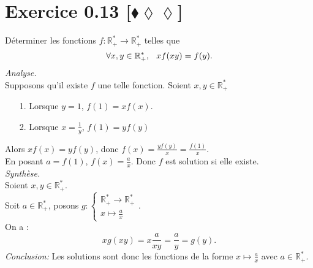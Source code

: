 \documentclass[10pt]{article}
\begin{document}
\section*{Exercice 0.13 [$\blacklozenge\lozenge\lozenge$]}
\begin{tcolorbox}[enhanced, width=7in, center, size=fbox, fontupper=\large, drop shadow southwest]
    Déterminer les fonctions $f: \mathbb{R}_+^* \rightarrow \mathbb{R}_+^*$ telles que 
    \begin{equation*}
        \forall{x,y\in\mathbb{R}^*_+}, \hspace{0.25cm} xf(xy) = f(y).
    \end{equation*}
    \emph{Analyse.}\\
    Supposons qu'il existe $f$ une telle fonction. Soient $x,y\in\mathbb{R}^*_+$
    \begin{itemize}
        \item[1.] Lorsque $y=1$, $f(1)=xf(x)$.
        \item[2.] Lorsque $x=\frac{1}{y}$, $f(1)=yf(y)$
    \end{itemize}
    Alors $xf(x)=yf(y)$, donc $f(x)=\frac{yf(y)}{x}=\frac{f(1)}{x}$.\\
    En posant $a=f(1)$, $f(x)=\frac{a}{x}$.
    Donc $f$ est solution si elle existe.\\[0.2cm]
    \emph{Synthèse.}\\
    Soient $x,y\in\mathbb{R}^*_+$.\\
    Soit $a\in\mathbb{R^*_+}$, posons $g:\begin{cases}\mathbb{R}^*_+\rightarrow\mathbb{R}^*_+\\x\mapsto\frac{a}{x}\end{cases}$.\\
    On a :
    \begin{equation*}
        xg(xy)=x\frac{a}{xy}=\frac{a}{y}=g(y).
    \end{equation*}
    \emph{Conclusion:}
    Les solutions sont donc les fonctions de la forme $x\mapsto\frac{a}{x}$ avec $a\in\mathbb{R^*_+}$.
\end{tcolorbox}
\end{document}
